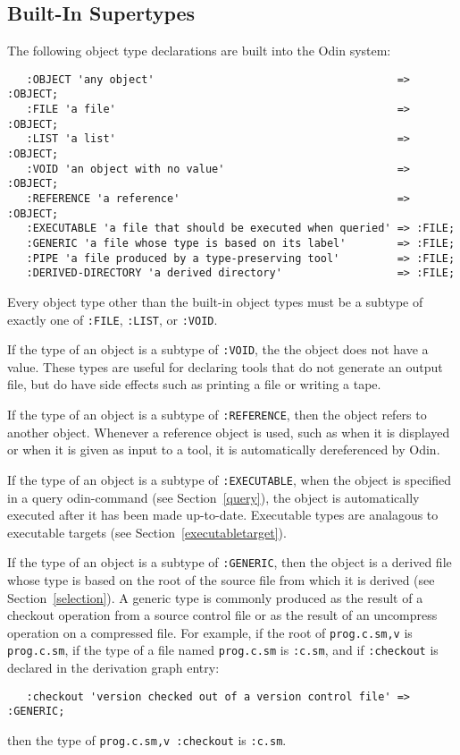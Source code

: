 \documentclass[hidelinks]{report}
\newcommand{\ex}{\tt}   %
\begin{document}
\subsection{Built-In Supertypes}
\label{builtin}

The following object type declarations are built into the Odin system:
\begin{verbatim}
   :OBJECT 'any object'                                      => :OBJECT;
   :FILE 'a file'                                            => :OBJECT;
   :LIST 'a list'                                            => :OBJECT;
   :VOID 'an object with no value'                           => :OBJECT;
   :REFERENCE 'a reference'                                  => :OBJECT;
   :EXECUTABLE 'a file that should be executed when queried' => :FILE;
   :GENERIC 'a file whose type is based on its label'        => :FILE;
   :PIPE 'a file produced by a type-preserving tool'         => :FILE;
   :DERIVED-DIRECTORY 'a derived directory'                  => :FILE;
\end{verbatim}
Every object type other than the built-in object types
must be a subtype of exactly one of
{\ex :FILE}, {\ex :LIST}, or {\ex :VOID}.

If the type of an object is a subtype of {\ex :VOID},
the the object does not have a value.
These types are useful for declaring tools that do not generate an output file,
but do have side effects such as printing a file or writing a tape.

If the type of an object is a subtype of {\ex :REFERENCE},
then the object refers to another object.
Whenever a reference object is used,
such as when it is displayed or when it is given as input to a tool,
it is automatically dereferenced by Odin.

If the type of an object is a subtype of {\ex :EXECUTABLE},
when the object is specified in a query odin-command (see Section~\ref{query}),
the object is automatically executed
after it has been made up-to-date.
Executable types are analagous to executable targets
(see Section~\ref{executabletarget}).

If the type of an object is a subtype of {\ex :GENERIC},
then the object is a derived file whose type
is based on the root of the source file from which it is derived
(see Section~\ref{selection}).
A generic type is commonly produced as the result of a checkout
operation from a source control file
or as the result of an uncompress operation on a compressed file.
For example, if the root of {\ex prog.c.sm,v} is {\ex prog.c.sm},
if the type of a file named {\ex prog.c.sm} is {\ex :c.sm},
and if {\ex :checkout} is declared in the derivation graph entry:
\begin{verbatim}
   :checkout 'version checked out of a version control file' => :GENERIC;
\end{verbatim}
then the type of {\ex prog.c.sm,v :checkout} is {\ex :c.sm}.
\end{document}
